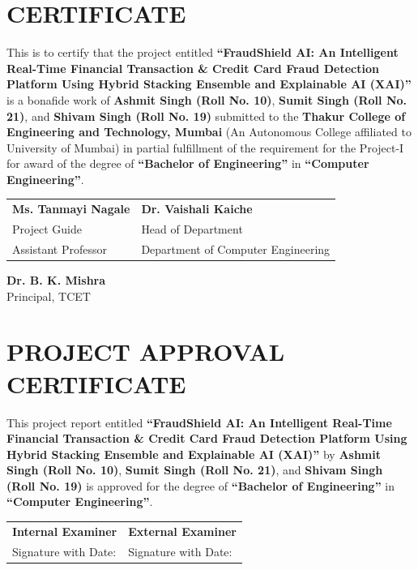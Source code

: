 \documentclass[12pt,a4paper,oneside]{report}
\begin{document}
\chapter*{CERTIFICATE}
\thispagestyle{plain}
\noindent This is to certify that the project entitled \textbf{``FraudShield AI: An Intelligent Real-Time Financial Transaction \& Credit Card Fraud Detection Platform Using Hybrid Stacking Ensemble and Explainable AI (XAI)''} is a bonafide work of \textbf{Ashmit Singh (Roll No. 10)}, \textbf{Sumit Singh (Roll No. 21)}, and \textbf{Shivam Singh (Roll No. 19)} submitted to the \textbf{Thakur College of Engineering and Technology, Mumbai} (An Autonomous College affiliated to University of Mumbai) in partial fulfillment of the requirement for the Project-I for award of the degree of \textbf{``Bachelor of Engineering''} in \textbf{``Computer Engineering''}.

\vspace{3.5cm}
\noindent
\begin{tabular}{p{3.0in}p{3.0in}}
\textbf{Ms. Tanmayi Nagale} & \textbf{Dr. Vaishali Kaiche} \\
Project Guide & Head of Department \\
Assistant Professor & Department of Computer Engineering \\
\end{tabular}

\vspace{2.0cm}
\begin{center}
\textbf{Dr. B. K. Mishra}\\
Principal, TCET
\end{center}

\newpage

\chapter*{PROJECT APPROVAL CERTIFICATE}
\thispagestyle{plain}
\noindent This project report entitled \textbf{``FraudShield AI: An Intelligent Real-Time Financial Transaction \& Credit Card Fraud Detection Platform Using Hybrid Stacking Ensemble and Explainable AI (XAI)''} by \textbf{Ashmit Singh (Roll No. 10)}, \textbf{Sumit Singh (Roll No. 21)}, and \textbf{Shivam Singh (Roll No. 19)} is approved for the degree of \textbf{``Bachelor of Engineering''} in \textbf{``Computer Engineering''}.

\vspace{3.5cm}
\noindent
\begin{tabular}{p{3.0in}p{3.0in}}
\textbf{Internal Examiner} & \textbf{External Examiner} \\
Signature with Date: \hrulefill & Signature with Date: \hrulefill \\
\end{tabular}
\end{document}
